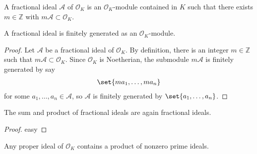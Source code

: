 \begin{defbox}
    \begin{definition}
        A fractional ideal \(\mathcal{A}\) of \(\mathcal{O}_K\) is an \(\mathcal{O}_K\)-module contained in \(K\) such that there exists \(m \in \mathbb{Z}\) with \(m \mathcal{A} \subset \mathcal{O}_K\).
    \end{definition}
\end{defbox}

\begin{thmbox}
    \begin{proposition}
        A fractional ideal is finitely generated as an \(\mathcal{O}_K\)-module.
    \end{proposition}
\end{thmbox}
\begin{proof}
    Let \(\mathcal{A}\) be a fractional ideal of \(\mathcal{O}_K\). By definition, there is an integer \(m \in \mathbb{Z}\) such that \(m \mathcal{A} \subset \mathcal{O}_K\). Since \(\mathcal{O}_K\) is Noetherian, the submodule \(m \mathcal{A}\) is finitely generated by say
    \begin{align}
        \set{m a_1, \ldots, m a_n}
    \end{align}
    for some \(a_1, \ldots, a_n \in \mathcal{A}\), so \(\mathcal{A}\) is finitely generated by \(\set{a_1, \ldots, a_n}\).
\end{proof}

\begin{thmbox}
    \begin{proposition}
        The sum and product of fractional ideals are again fractional ideals.
    \end{proposition}
\end{thmbox}

\begin{proof}
    easy
\end{proof}

\begin{thmbox}
    \begin{lemma}
        Any proper ideal of \(\mathcal{O}_K\) contains a product of nonzero prime ideals.
    \end{lemma}
\end{thmbox}


